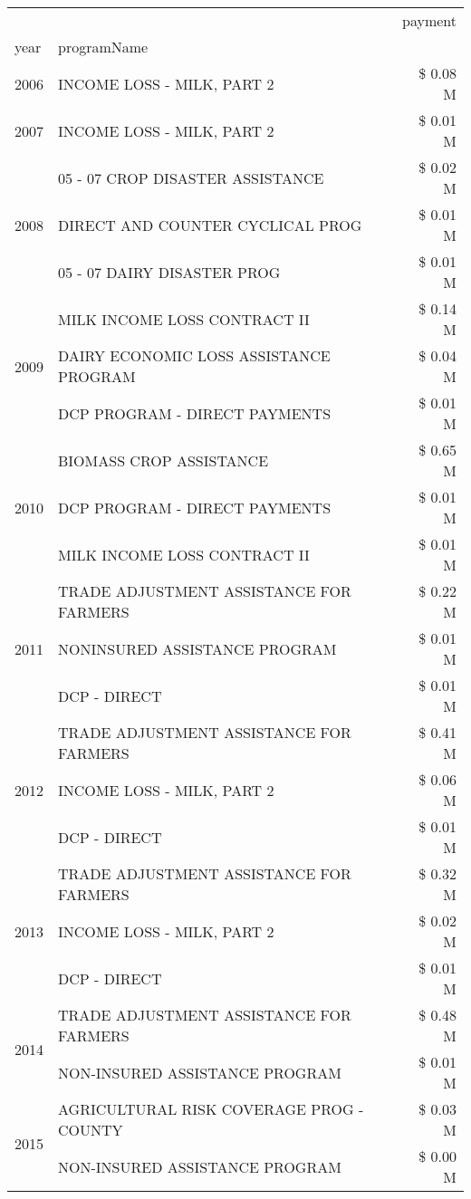 \begin{tabular}{llr}
\toprule
 &  & payment \\
year & programName &  \\
\midrule
2006 & INCOME LOSS - MILK, PART 2 & \$ 0.08 M \\
\cline{1-3}
2007 & INCOME LOSS - MILK, PART 2 & \$ 0.01 M \\
\cline{1-3}
\multirow[t]{3}{*}{2008} & 05 - 07 CROP DISASTER ASSISTANCE & \$ 0.02 M \\
 & DIRECT AND COUNTER CYCLICAL PROG & \$ 0.01 M \\
 & 05 - 07 DAIRY DISASTER PROG & \$ 0.01 M \\
\cline{1-3}
\multirow[t]{3}{*}{2009} & MILK INCOME LOSS CONTRACT II & \$ 0.14 M \\
 & DAIRY ECONOMIC LOSS ASSISTANCE PROGRAM & \$ 0.04 M \\
 & DCP PROGRAM - DIRECT PAYMENTS & \$ 0.01 M \\
\cline{1-3}
\multirow[t]{3}{*}{2010} & BIOMASS CROP ASSISTANCE & \$ 0.65 M \\
 & DCP PROGRAM - DIRECT PAYMENTS & \$ 0.01 M \\
 & MILK INCOME LOSS CONTRACT II & \$ 0.01 M \\
\cline{1-3}
\multirow[t]{3}{*}{2011} & TRADE ADJUSTMENT ASSISTANCE FOR FARMERS & \$ 0.22 M \\
 & NONINSURED ASSISTANCE PROGRAM & \$ 0.01 M \\
 & DCP - DIRECT & \$ 0.01 M \\
\cline{1-3}
\multirow[t]{3}{*}{2012} & TRADE ADJUSTMENT ASSISTANCE FOR FARMERS & \$ 0.41 M \\
 & INCOME LOSS - MILK, PART 2 & \$ 0.06 M \\
 & DCP - DIRECT & \$ 0.01 M \\
\cline{1-3}
\multirow[t]{3}{*}{2013} & TRADE ADJUSTMENT ASSISTANCE FOR FARMERS & \$ 0.32 M \\
 & INCOME LOSS - MILK, PART 2 & \$ 0.02 M \\
 & DCP - DIRECT & \$ 0.01 M \\
\cline{1-3}
\multirow[t]{2}{*}{2014} & TRADE ADJUSTMENT ASSISTANCE FOR FARMERS & \$ 0.48 M \\
 & NON-INSURED ASSISTANCE PROGRAM & \$ 0.01 M \\
\cline{1-3}
\multirow[t]{3}{*}{2015} & AGRICULTURAL RISK COVERAGE PROG - COUNTY & \$ 0.03 M \\
 & NON-INSURED ASSISTANCE PROGRAM & \$ 0.00 M \\

\end{tabular}
